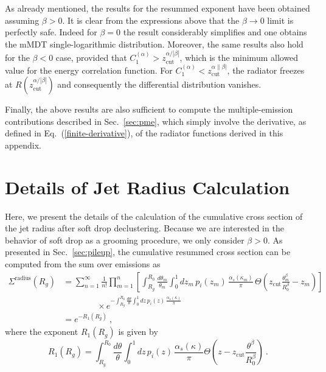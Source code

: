 \documentclass[letterpaper,11pt]{article}
\newcommand{\C}[2]{C^{(#2)}_{#1}}
\newcommand{\zcut}{z_\text{cut}}
\newcommand{\ea}{{\C{1}{\alpha}}}
\DeclareRobustCommand{\Sec}[1]{Sec.~\ref{#1}}
\DeclareRobustCommand{\Eq}[1]{Eq.~(\ref{#1})}
\begin{document}
As already mentioned, the results for the resummed exponent have been obtained assuming $\beta>0$. It is clear from the expressions above that the $\beta \to 0 $ limit is perfectly safe.  Indeed for $\beta=0$ the result considerably simplifies and one obtains the mMDT single-logarithmic distribution. Moreover, the same results also hold for the $\beta<0$ case, provided that $\ea > \zcut^{\alpha/|\beta|}$, which is the minimum allowed value for the energy correlation function. For $\ea < \zcut^{\alpha\|\beta|}$, the radiator freezes at $R\left(\zcut^{\alpha/|\beta|}\right)$ and consequently the differential distribution vanishes.

Finally, the above results are also sufficient to compute the multiple-emission contributions described in Sec.~\ref{sec:pme}, which simply involve the derivative, as defined in \Eq{finite-derivative}, of the radiator functions derived in this appendix.


\section{Details of Jet Radius Calculation}
\label{app:rdist}

Here, we present the details of the calculation of the cumulative cross section of the jet radius after soft drop declustering. Because we are interested in the behavior of soft drop as a grooming procedure, we only consider $\beta>0$. As presented in \Sec{sec:pileup}, the cumulative resummed cross section can be computed from the sum over emissions as
\begin{align}\label{eq:rg_cum}
\Sigma^\text{radius}(R_g) &= \sum_{n=1}^\infty \frac{1}{n!} \prod_{m=1}^n\left[ \int_{R_g}^{R_0} \frac{d\theta_m}{\theta_m} \int_0^1 dz_m \, p_i(z_m)\, \frac{\alpha_s(\kappa_{m})}{\pi} \, \Theta\left(  z_\text{cut}\frac{\theta_m^\beta}{R_0^\beta}-z_m \right) \right] 
\nonumber \\ 
& \qquad\qquad \times 
e^{-\int_{R_g}^{R_0} \frac{d\theta}{\theta}\int_0^1 dz\, p_i(z)\, \frac{\alpha_s(\kappa)}{\pi}}\nonumber \\
&= e^{-R_1(R_g)} \ ,
\end{align}
where the exponent $R_1(R_g)$ is given by
\begin{equation}\label{eq:rexp}
R_1(R_g)=\int_{R_g}^{R_0} \frac{d\theta}{\theta}\int_0^1 dz\, p_i(z) \, \frac{\alpha_s(\kappa)}{\pi}\Theta\left( z- z_\text{cut}\frac{\theta^\beta}{R_0^\beta} \right) \ .
\end{equation}
\end{document}
